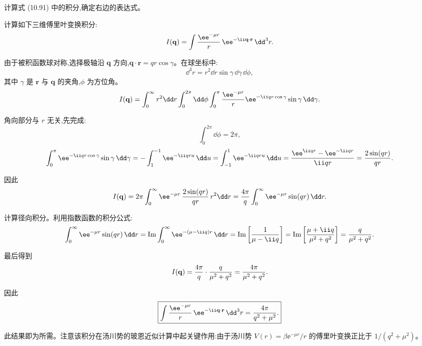 \begin{question}
计算式 (10.91) 中的积分,确定右边的表达式。

\par\smallskip
{}

\end{question}
\begin{solution}
计算如下三维傅里叶变换积分:
\[
I(\mathbf q)=\int {\ee^{-\mu r}\over r}\,\ee^{-\ii\mathbf q\cdot\mathbf r}\,\dd^3r.
\]

由于被积函数球对称,选择极轴沿 $\mathbf q$ 方向,$\mathbf q\cdot\mathbf r=qr\cos\gamma$。在球坐标中:
\[
\dd^3r=r^2\dd r\sin\gamma\,\dd\gamma\,\dd\phi,
\]
其中 $\gamma$ 是 $\mathbf r$ 与 $\mathbf q$ 的夹角,$\phi$ 为方位角。
\[
I(\mathbf q)=\int_0^\infty r^2\dd r\int_0^{2\pi}\dd\phi\int_0^\pi {\ee^{-\mu r}\over r}\ee^{-\ii qr\cos\gamma}\sin\gamma\,\dd\gamma.
\]

角向部分与 $r$ 无关,先完成:
\[
\int_0^{2\pi}\dd\phi=2\pi,
\]
\[
\int_0^\pi \ee^{-\ii qr\cos\gamma}\sin\gamma\,\dd\gamma
=-\int_1^{-1}\ee^{-\ii qr u}\,\dd u
=\int_{-1}^{1}\ee^{-\ii qr u}\,\dd u
={\ee^{\ii qr}-\ee^{-\ii qr}\over\ii qr}={2\sin(qr)\over qr}.
\]

因此
\[
I(\mathbf q)=2\pi\int_0^\infty \ee^{-\mu r}\,{2\sin(qr)\over qr}\,r^2\dd r
={4\pi\over q}\int_0^\infty \ee^{-\mu r}\sin(qr)\,\dd r.
\]

计算径向积分。利用指数函数的积分公式:
\[
\int_0^\infty \ee^{-\mu r}\sin(qr)\,\dd r
=\operatorname{Im}\int_0^\infty \ee^{-(\mu-\ii q)r}\,\dd r
=\operatorname{Im}\left[{1\over\mu-\ii q}\right]
=\operatorname{Im}\left[{\mu+\ii q\over\mu^2+q^2}\right]
={q\over\mu^2+q^2}.
\]

最后得到
\[
I(\mathbf q)={4\pi\over q}\cdot{q\over\mu^2+q^2}
={4\pi\over\mu^2+q^2}.
\]

因此
\[
\boxed{\int {\ee^{-\mu r}\over r}\,\ee^{-\ii\mathbf q\cdot\mathbf r}\,\dd^3r={4\pi\over q^2+\mu^2}.}
\]

此结果即为所需。注意该积分在汤川势的玻恩近似计算中起关键作用:由于汤川势 $V(r)=\beta \ee^{-\mu r}/r$ 的傅里叶变换正比于 $1/(q^2+\mu^2)$。
\end{solution}

